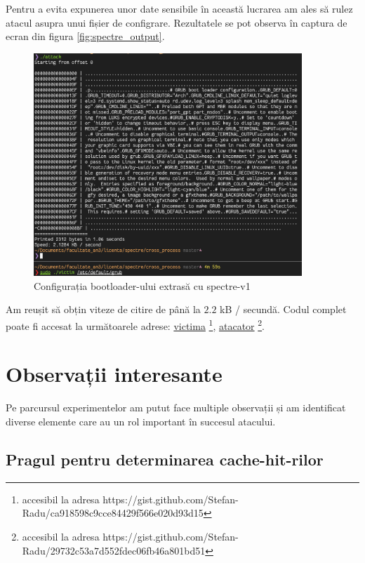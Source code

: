 Pentru a evita expunerea unor date sensibile în această lucrarea am ales să rulez atacul asupra unui fișier de configrare. Rezultatele se pot observa în captura de ecran
din figura \ref{fig:spectre_output}.

\begin{figure}[ht]
	\centering
	\includegraphics[width=0.9\textwidth]{images/poc_rezultate.png}
	\caption{Configurația bootloader-ului extrasă cu spectre-v1}
\end{figure}
\label{fig:spectre_output}

Am reușit să obțin viteze de citire de până la $2.2$ kB / secundă. Codul
complet poate fi accesat la următoarele adrese:
\href{https://gist.github.com/Stefan-Radu/ca918598c9cce84429f566e020d93d15}{victima} \footnote[1]{accesibil la adresa https://gist.github.com/Stefan-Radu/ca918598c9cce84429f566e020d93d15},
	\href{https://gist.github.com/Stefan-Radu/29732c53a7d552fdec06fb46a801bd51}{atacator} \footnote[2]{accesibil la adresa https://gist.github.com/Stefan-Radu/29732c53a7d552fdec06fb46a801bd51}.


\section{Observații interesante}

Pe parcursul experimentelor am putut face multiple observații și am identificat
diverse elemente care au un rol important în succesul atacului.

\subsection{Pragul pentru determinarea cache-hit-rilor}
\label{subsec:threshold_tool}

